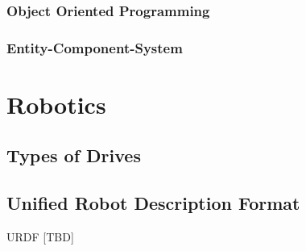 \subsubsection{Object Oriented Programming}


\subsubsection{Entity-Component-System}



\section{Robotics}
\subsection{Types of Drives}
\subsection{Unified Robot Description Format}
\ac{URDF} [TBD]